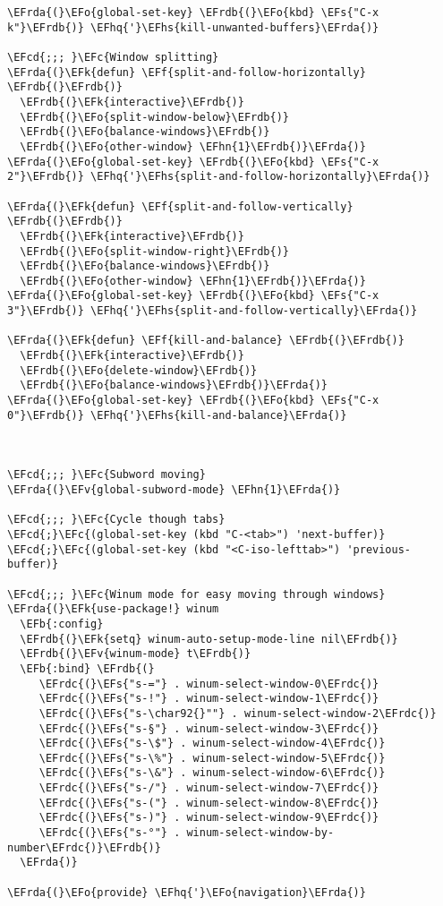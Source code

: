\documentclass[a4wide,10pt]{article}
\newcommand{\EFc}[1]{\textcolor{EFc}{#1}} %
\newcommand{\EFcd}[1]{\textcolor{EFcd}{#1}} %
\newcommand{\EFs}[1]{\textcolor{EFs}{#1}} %
\newcommand{\EFk}[1]{\textcolor{EFk}{#1}} %
\newcommand{\EFb}[1]{\textcolor{EFb}{#1}} %
\newcommand{\EFf}[1]{\textcolor{EFf}{#1}} %
\newcommand{\EFv}[1]{\textcolor{EFv}{#1}} %
\newcommand{\EFo}[1]{\textcolor{EFo}{#1}} %
\newcommand{\EFhn}[1]{\textcolor{EFhn}{\textbf{#1}}} %
\newcommand{\EFhq}[1]{\textcolor{EFhq}{#1}} %
\newcommand{\EFhs}[1]{\textcolor{EFhs}{#1}} %
\newcommand{\EFrda}[1]{\textcolor{EFrda}{#1}} %
\newcommand{\EFrdb}[1]{\textcolor{EFrdb}{#1}} %
\newcommand{\EFrdc}[1]{\textcolor{EFrdc}{#1}} %
\begin{document}
\begin{Code}
\begin{Verbatim}
\EFrda{(}\EFo{global-set-key} \EFrdb{(}\EFo{kbd} \EFs{"C-x k"}\EFrdb{)} \EFhq{'}\EFhs{kill-unwanted-buffers}\EFrda{)}

\EFcd{;;; }\EFc{Window splitting}
\EFrda{(}\EFk{defun} \EFf{split-and-follow-horizontally} \EFrdb{(}\EFrdb{)}
  \EFrdb{(}\EFk{interactive}\EFrdb{)}
  \EFrdb{(}\EFo{split-window-below}\EFrdb{)}
  \EFrdb{(}\EFo{balance-windows}\EFrdb{)}
  \EFrdb{(}\EFo{other-window} \EFhn{1}\EFrdb{)}\EFrda{)}
\EFrda{(}\EFo{global-set-key} \EFrdb{(}\EFo{kbd} \EFs{"C-x 2"}\EFrdb{)} \EFhq{'}\EFhs{split-and-follow-horizontally}\EFrda{)}

\EFrda{(}\EFk{defun} \EFf{split-and-follow-vertically} \EFrdb{(}\EFrdb{)}
  \EFrdb{(}\EFk{interactive}\EFrdb{)}
  \EFrdb{(}\EFo{split-window-right}\EFrdb{)}
  \EFrdb{(}\EFo{balance-windows}\EFrdb{)}
  \EFrdb{(}\EFo{other-window} \EFhn{1}\EFrdb{)}\EFrda{)}
\EFrda{(}\EFo{global-set-key} \EFrdb{(}\EFo{kbd} \EFs{"C-x 3"}\EFrdb{)} \EFhq{'}\EFhs{split-and-follow-vertically}\EFrda{)}

\EFrda{(}\EFk{defun} \EFf{kill-and-balance} \EFrdb{(}\EFrdb{)}
  \EFrdb{(}\EFk{interactive}\EFrdb{)}
  \EFrdb{(}\EFo{delete-window}\EFrdb{)}
  \EFrdb{(}\EFo{balance-windows}\EFrdb{)}\EFrda{)}
\EFrda{(}\EFo{global-set-key} \EFrdb{(}\EFo{kbd} \EFs{"C-x 0"}\EFrdb{)} \EFhq{'}\EFhs{kill-and-balance}\EFrda{)}



\EFcd{;;; }\EFc{Subword moving}
\EFrda{(}\EFv{global-subword-mode} \EFhn{1}\EFrda{)}

\EFcd{;;; }\EFc{Cycle though tabs}
\EFcd{;}\EFc{(global-set-key (kbd "C-<tab>") 'next-buffer)}
\EFcd{;}\EFc{(global-set-key (kbd "<C-iso-lefttab>") 'previous-buffer)}

\EFcd{;;; }\EFc{Winum mode for easy moving through windows}
\EFrda{(}\EFk{use-package!} winum
  \EFb{:config}
  \EFrdb{(}\EFk{setq} winum-auto-setup-mode-line nil\EFrdb{)}
  \EFrdb{(}\EFv{winum-mode} t\EFrdb{)}
  \EFb{:bind} \EFrdb{(}
	 \EFrdc{(}\EFs{"s-="} . winum-select-window-0\EFrdc{)}
	 \EFrdc{(}\EFs{"s-!"} . winum-select-window-1\EFrdc{)}
	 \EFrdc{(}\EFs{"s-\char92{}""} . winum-select-window-2\EFrdc{)}
	 \EFrdc{(}\EFs{"s-§"} . winum-select-window-3\EFrdc{)}
	 \EFrdc{(}\EFs{"s-\$"} . winum-select-window-4\EFrdc{)}
	 \EFrdc{(}\EFs{"s-\%"} . winum-select-window-5\EFrdc{)}
	 \EFrdc{(}\EFs{"s-\&"} . winum-select-window-6\EFrdc{)}
	 \EFrdc{(}\EFs{"s-/"} . winum-select-window-7\EFrdc{)}
	 \EFrdc{(}\EFs{"s-("} . winum-select-window-8\EFrdc{)}
	 \EFrdc{(}\EFs{"s-)"} . winum-select-window-9\EFrdc{)}
	 \EFrdc{(}\EFs{"s-°"} . winum-select-window-by-number\EFrdc{)}\EFrdb{)}
  \EFrda{)}

\EFrda{(}\EFo{provide} \EFhq{'}\EFo{navigation}\EFrda{)}
\end{Verbatim}
\end{Code}
\end{document}

